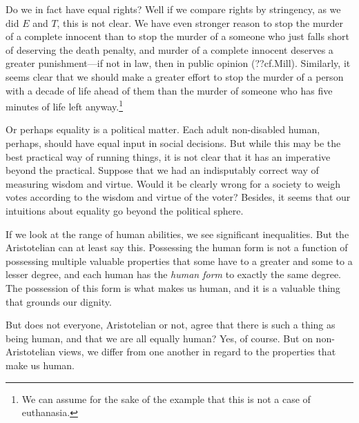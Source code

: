 Do we in fact have equal rights? Well if we compare rights by stringency, as we did $E$ and $T$, this is not clear.
We have even stronger reason to stop the murder of a complete innocent than to stop the murder of a someone who just falls
short of deserving the death penalty, and murder of a complete innocent deserves a greater punishment---if not in law, then
in public opinion (??cf.Mill). Similarly, it seems clear that we should make a greater effort to stop the murder of a person
with a decade of life ahead of them than the murder of someone who has five minutes of life left anyway.\footnote{We can assume
for the sake of the example that this is not a case of euthanasia.} 

Or perhaps equality is a political matter. Each adult non-disabled human, perhaps, should have equal 
input in social decisions. But while this may be the best practical way of running things, it is not
clear that it has an imperative beyond the practical. Suppose that we had an indisputably correct way
of measuring wisdom and virtue. Would it be clearly wrong for a society to weigh votes according to 
the wisdom and virtue of the voter? Besides, it seems that our intuitions about equality go beyond
the political sphere.

If we look at the range of human abilities, we see significant inequalities. But the Aristotelian can at least say
this. Possessing the human form is not a function of possessing multiple valuable properties that some have to a 
greater and some to a lesser degree, and each human has the \textit{human form} to exactly the same degree. The 
possession of this form is what makes us human, and it is a valuable thing that grounds our dignity. 

But does not everyone, Aristotelian or not, agree that there is such a thing as being human, and that we are all 
equally human? Yes, of course. But on non-Aristotelian views, we differ from one another in regard to the properties
that make us human. 

